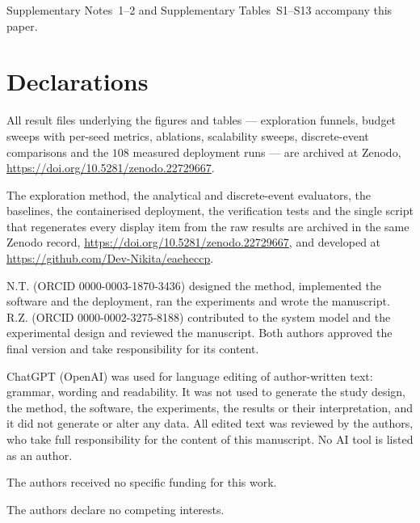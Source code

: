 \documentclass[pdflatex,sn-nature,lineno]{sn-jnl}
\begin{document}
\maketitle









\backmatter

Supplementary Notes~1--2 and Supplementary Tables~S1--S13 accompany this paper.

\section*{Declarations}

All result files underlying the figures and tables --- exploration funnels, budget sweeps
with per-seed metrics, ablations, scalability sweeps, discrete-event comparisons and the
$108$ measured deployment runs --- are archived at Zenodo,
\url{https://doi.org/10.5281/zenodo.22729667}.

The exploration method, the analytical and discrete-event evaluators, the baselines, the
containerised deployment, the verification tests and the single script that regenerates
every display item from the raw results are archived in the same Zenodo record,
\url{https://doi.org/10.5281/zenodo.22729667}, and developed at
\url{https://github.com/Dev-Nikita/eaeheccp}.

N.T. (ORCID 0000-0003-1870-3436) designed the method, implemented the software and the
deployment, ran the experiments and wrote the manuscript. R.Z. (ORCID
0000-0002-3275-8188) contributed to the system model and the experimental design and
reviewed the manuscript. Both authors approved the final version and take responsibility
for its content.

ChatGPT (OpenAI) was used for language editing of author-written text: grammar, wording
and readability. It was not used to generate the study design, the method, the software,
the experiments, the results or their interpretation, and it did not generate or alter any
data. All edited text was reviewed by the authors, who take full responsibility for the
content of this manuscript. No AI tool is listed as an author.

The authors received no specific funding for this work.

The authors declare no competing interests.


\end{document}
